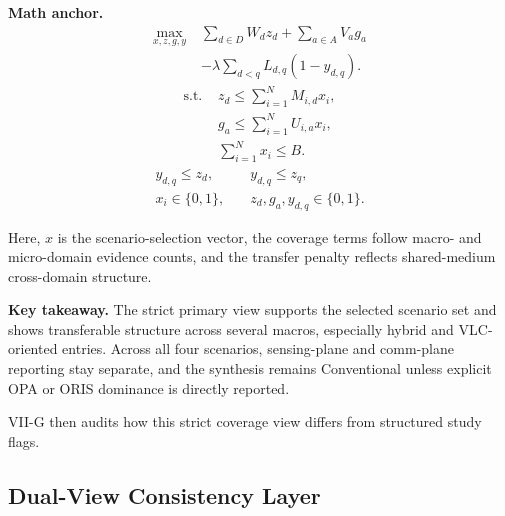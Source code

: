 \documentclass[letterpaper,journal]{IEEEtran}
\begin{document}
\textbf{Math anchor.}
\begin{equation}
    \begin{split}
        \max_{x,z,g,y}\; & \sum_{d \in D} W_d z_d + \sum_{a \in A} V_a g_a \\
                         & - \lambda \sum_{d<q} L_{d,q}(1-y_{d,q}).
    \end{split}
\end{equation}
\begin{equation}
    \begin{split}
        \text{s.t. } & z_d \le \sum_{i=1}^{N} M_{i,d}x_i, \\
                     & g_a \le \sum_{i=1}^{N} U_{i,a}x_i, \\
                     & \sum_{i=1}^{N}x_i \le B.
    \end{split}
\end{equation}
\begin{equation}
    \begin{split}
        y_{d,q}\le z_d,\quad  & y_{d,q}\le z_q,            \\
        x_i \in \{0,1\},\quad & z_d,g_a,y_{d,q}\in\{0,1\}.
    \end{split}
\end{equation}

Here, $x$ is the scenario-selection vector, the coverage terms follow macro- and micro-domain evidence counts, and the transfer penalty reflects shared-medium cross-domain structure.

\textbf{Key takeaway.} The strict primary view supports the selected scenario set and shows transferable structure across several macros, especially hybrid and VLC-oriented entries. Across all four scenarios, sensing-plane and comm-plane reporting stay separate, and the synthesis remains Conventional unless explicit OPA or ORIS dominance is directly reported.

VII-G then audits how this strict coverage view differs from structured study flags.

\subsection{Dual-View Consistency Layer}
\end{document}
